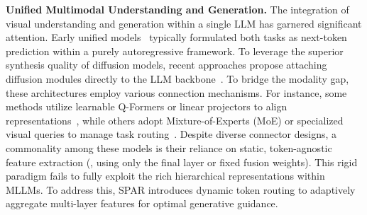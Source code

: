 \documentclass[runningheads]{llncs}
\begin{document}
\noindent\textbf{Unified Multimodal Understanding and Generation.}
The integration of visual understanding and generation within a single LLM has garnered significant attention. Early unified models~\cite{team2024chameleon, yu2024cm3leon} typically formulated both tasks as next-token prediction within a purely autoregressive framework. To leverage the superior synthesis quality of diffusion models, recent approaches propose attaching diffusion modules directly to the LLM backbone~\cite{sun2023emu, xie2024showo}. To bridge the modality gap, these architectures employ various connection mechanisms. For instance, some methods utilize learnable Q-Formers or linear projectors to align representations~\cite{chen2025blip3, wu2025openuni}, while others adopt Mixture-of-Experts (MoE) or specialized visual queries to manage task routing~\cite{deng2025bagel, tang2025unilip, lin2025uniworld}. 
Despite diverse connector designs, a commonality among these models is their reliance on static, token-agnostic feature extraction (\eg, using only the final layer or fixed fusion weights). This rigid paradigm fails to fully exploit the rich hierarchical representations within MLLMs. To address this, SPAR introduces dynamic token routing to adaptively aggregate multi-layer features for optimal generative guidance.
\end{document}
